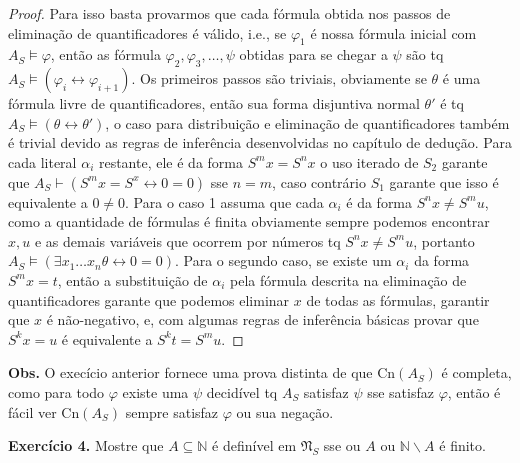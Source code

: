 \documentclass[11pt]{article}
\newcommand{\mf}[1]{\mathfrak{#1}}
\newcommand{\mbb}[1]{\mathbb{#1}}
\begin{document}
\begin{proof}
    Para isso basta provarmos que cada fórmula obtida nos passos de eliminação de quantificadores é válido, i.e., se $\varphi_1$ é nossa fórmula inicial com $A_S\vDash\varphi$, então as fórmula $\varphi_2,\varphi_3,\dots,\psi$ obtidas para se chegar a $\psi$ são tq $A_S\vDash(\varphi_i\leftrightarrow\varphi_{i+1})$. Os primeiros passos são triviais, obviamente se $\theta$ é uma fórmula livre de quantificadores, então sua forma disjuntiva normal $\theta'$ é tq $A_S\vDash(\theta\leftrightarrow\theta')$, o caso para distribuição e eliminação de quantificadores também é trivial devido as regras de inferência desenvolvidas no capítulo de dedução. Para cada literal $\alpha_i$ restante, ele é da forma $S^mx=S^nx$ o uso iterado de $S_2$ garante que $A_S\vdash(S^mx=S^x\leftrightarrow0=0)$ sse $n=m$, caso contrário $S_1$ garante que isso é equivalente a $0\neq0$. Para o caso 1 assuma que cada $\alpha_i$ é da forma $S^nx\neq S^mu$, como a quantidade de fórmulas é finita obviamente sempre podemos encontrar $x,u$ e as demais variáveis que ocorrem por números tq $S^nx\neq S^mu$, portanto $A_S\vDash(\exists x_1\dots x_n\theta\leftrightarrow0=0)$. Para o segundo caso, se existe um $\alpha_i$ da forma $S^mx=t$, então a substituição de $\alpha_i$ pela fórmula descrita na eliminação de quantificadores garante que podemos eliminar $x$ de todas as fórmulas, garantir que $x$ é não-negativo, e, com algumas regras de inferência básicas provar que $S^kx=u$ é equivalente a $S^kt=S^mu$.
\end{proof}

\begin{shaded}
\textbf{Obs.} O execício anterior fornece uma prova distinta de que $\text{Cn}(A_S)$ é completa, como para todo $\varphi$ existe uma $\psi$ decidível tq $A_S$ satisfaz $\psi$ sse satisfaz $\varphi$, então é fácil ver $\text{Cn}(A_S)$ sempre satisfaz $\varphi$ ou sua negação.
\end{shaded}

\begin{shaded}
\textbf{Exercício 4.} Mostre que $A\subseteq\mbb{N}$ é definível em $\mf{N}_S$ sse ou $A$ ou $\mbb{N}\backslash A$ é finito.
\end{shaded}
\end{document}
